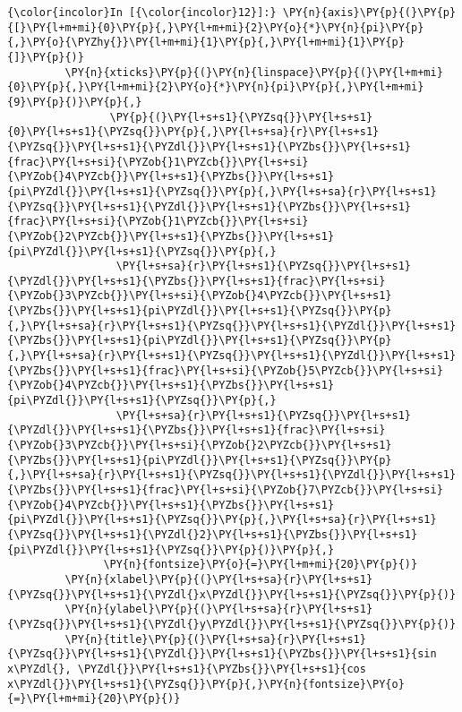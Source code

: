     \begin{Verbatim}[commandchars=\\\{\}]
{\color{incolor}In [{\color{incolor}12}]:} \PY{n}{axis}\PY{p}{(}\PY{p}{[}\PY{l+m+mi}{0}\PY{p}{,}\PY{l+m+mi}{2}\PY{o}{*}\PY{n}{pi}\PY{p}{,}\PY{o}{\PYZhy{}}\PY{l+m+mi}{1}\PY{p}{,}\PY{l+m+mi}{1}\PY{p}{]}\PY{p}{)}
         \PY{n}{xticks}\PY{p}{(}\PY{n}{linspace}\PY{p}{(}\PY{l+m+mi}{0}\PY{p}{,}\PY{l+m+mi}{2}\PY{o}{*}\PY{n}{pi}\PY{p}{,}\PY{l+m+mi}{9}\PY{p}{)}\PY{p}{,}
                \PY{p}{(}\PY{l+s+s1}{\PYZsq{}}\PY{l+s+s1}{0}\PY{l+s+s1}{\PYZsq{}}\PY{p}{,}\PY{l+s+sa}{r}\PY{l+s+s1}{\PYZsq{}}\PY{l+s+s1}{\PYZdl{}}\PY{l+s+s1}{\PYZbs{}}\PY{l+s+s1}{frac}\PY{l+s+si}{\PYZob{}1\PYZcb{}}\PY{l+s+si}{\PYZob{}4\PYZcb{}}\PY{l+s+s1}{\PYZbs{}}\PY{l+s+s1}{pi\PYZdl{}}\PY{l+s+s1}{\PYZsq{}}\PY{p}{,}\PY{l+s+sa}{r}\PY{l+s+s1}{\PYZsq{}}\PY{l+s+s1}{\PYZdl{}}\PY{l+s+s1}{\PYZbs{}}\PY{l+s+s1}{frac}\PY{l+s+si}{\PYZob{}1\PYZcb{}}\PY{l+s+si}{\PYZob{}2\PYZcb{}}\PY{l+s+s1}{\PYZbs{}}\PY{l+s+s1}{pi\PYZdl{}}\PY{l+s+s1}{\PYZsq{}}\PY{p}{,}
                 \PY{l+s+sa}{r}\PY{l+s+s1}{\PYZsq{}}\PY{l+s+s1}{\PYZdl{}}\PY{l+s+s1}{\PYZbs{}}\PY{l+s+s1}{frac}\PY{l+s+si}{\PYZob{}3\PYZcb{}}\PY{l+s+si}{\PYZob{}4\PYZcb{}}\PY{l+s+s1}{\PYZbs{}}\PY{l+s+s1}{pi\PYZdl{}}\PY{l+s+s1}{\PYZsq{}}\PY{p}{,}\PY{l+s+sa}{r}\PY{l+s+s1}{\PYZsq{}}\PY{l+s+s1}{\PYZdl{}}\PY{l+s+s1}{\PYZbs{}}\PY{l+s+s1}{pi\PYZdl{}}\PY{l+s+s1}{\PYZsq{}}\PY{p}{,}\PY{l+s+sa}{r}\PY{l+s+s1}{\PYZsq{}}\PY{l+s+s1}{\PYZdl{}}\PY{l+s+s1}{\PYZbs{}}\PY{l+s+s1}{frac}\PY{l+s+si}{\PYZob{}5\PYZcb{}}\PY{l+s+si}{\PYZob{}4\PYZcb{}}\PY{l+s+s1}{\PYZbs{}}\PY{l+s+s1}{pi\PYZdl{}}\PY{l+s+s1}{\PYZsq{}}\PY{p}{,}
                 \PY{l+s+sa}{r}\PY{l+s+s1}{\PYZsq{}}\PY{l+s+s1}{\PYZdl{}}\PY{l+s+s1}{\PYZbs{}}\PY{l+s+s1}{frac}\PY{l+s+si}{\PYZob{}3\PYZcb{}}\PY{l+s+si}{\PYZob{}2\PYZcb{}}\PY{l+s+s1}{\PYZbs{}}\PY{l+s+s1}{pi\PYZdl{}}\PY{l+s+s1}{\PYZsq{}}\PY{p}{,}\PY{l+s+sa}{r}\PY{l+s+s1}{\PYZsq{}}\PY{l+s+s1}{\PYZdl{}}\PY{l+s+s1}{\PYZbs{}}\PY{l+s+s1}{frac}\PY{l+s+si}{\PYZob{}7\PYZcb{}}\PY{l+s+si}{\PYZob{}4\PYZcb{}}\PY{l+s+s1}{\PYZbs{}}\PY{l+s+s1}{pi\PYZdl{}}\PY{l+s+s1}{\PYZsq{}}\PY{p}{,}\PY{l+s+sa}{r}\PY{l+s+s1}{\PYZsq{}}\PY{l+s+s1}{\PYZdl{}2}\PY{l+s+s1}{\PYZbs{}}\PY{l+s+s1}{pi\PYZdl{}}\PY{l+s+s1}{\PYZsq{}}\PY{p}{)}\PY{p}{,}
               \PY{n}{fontsize}\PY{o}{=}\PY{l+m+mi}{20}\PY{p}{)}
         \PY{n}{xlabel}\PY{p}{(}\PY{l+s+sa}{r}\PY{l+s+s1}{\PYZsq{}}\PY{l+s+s1}{\PYZdl{}x\PYZdl{}}\PY{l+s+s1}{\PYZsq{}}\PY{p}{)}
         \PY{n}{ylabel}\PY{p}{(}\PY{l+s+sa}{r}\PY{l+s+s1}{\PYZsq{}}\PY{l+s+s1}{\PYZdl{}y\PYZdl{}}\PY{l+s+s1}{\PYZsq{}}\PY{p}{)}
         \PY{n}{title}\PY{p}{(}\PY{l+s+sa}{r}\PY{l+s+s1}{\PYZsq{}}\PY{l+s+s1}{\PYZdl{}}\PY{l+s+s1}{\PYZbs{}}\PY{l+s+s1}{sin x\PYZdl{}, \PYZdl{}}\PY{l+s+s1}{\PYZbs{}}\PY{l+s+s1}{cos x\PYZdl{}}\PY{l+s+s1}{\PYZsq{}}\PY{p}{,}\PY{n}{fontsize}\PY{o}{=}\PY{l+m+mi}{20}\PY{p}{)}

\end{Verbatim}
